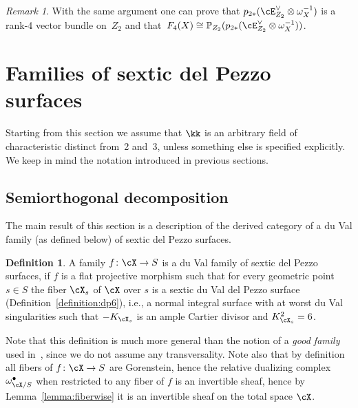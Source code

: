 \documentclass[11pt]{amsart}
\renewcommand{\P}{{\mathbb{P}}}
\theoremstyle{plain}
\theoremstyle{definition}
\newtheorem{definition}[theorem]{Definition}
\theoremstyle{remark}
\newtheorem{remark}[theorem]{Remark}
\begin{document}
\begin{remark}
\label{remark:f4}
With the same argument one can prove that $p_{2*}(\cE_{Z_2}^\vee \otimes \omega_X^{-1})$ is a rank-4 vector bundle on~$Z_2$ 
and that~$F_4(X) \cong \P_{Z_2}(p_{2*}(\cE_{Z_2}^\vee \otimes \omega_X^{-1}))$.
\end{remark}


\section{Families of sextic del Pezzo surfaces}\label{section:families}







Starting from this section we assume that $\kk$ is an arbitrary field of characteristic distinct from~2 and~3, unless something else is specified explicitly.
We keep in mind the notation introduced in previous sections.


\subsection{Semiorthogonal decomposition}\label{subsection:derived-family}

The main result of this section is a description of the derived category of a du Val family (as defined below) of sextic del Pezzo surfaces.

\begin{definition}\label{definition:family-dp6}
A family $f \colon \cX \to S$ is a {\sf du Val family} of sextic del Pezzo surfaces, if $f$ is a flat projective morphism such that 
for every geometric point $s \in S$ the fiber $\cX_s$ of $\cX$ over $s$ is a sextic du Val del Pezzo surface (Definition~\ref{definition:dp6}), 
i.e., a normal integral surface with at worst du Val singularities such that $-K_{\cX_s}$ is an ample Cartier divisor and $K_{\cX_s}^2 = 6$.
\end{definition}



Note that this definition is much more general than the notion of a \emph{good family} used in~\cite{addington2016cubic}, 
since we do not assume any transversality.
Note also that by definition all fibers of $f \colon \cX \to S$ are Gorenstein, 
hence the relative dualizing complex $\omega_{\cX/S}^\bullet$ when restricted to any fiber of $f$ is an invertible sheaf, 
hence by Lemma~\ref{lemma:fiberwise} it is an invertible sheaf on the total space $\cX$.
\end{document}
